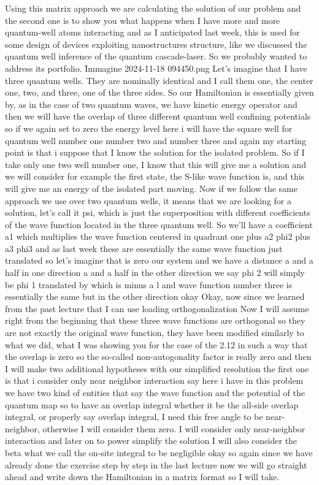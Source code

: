 Using this matrix approach we are calculating the solution of our problem and the second one is to show you what happens when I have more and more quantum-well atoms interacting and as I anticipated last week, this is used for some design of devices exploiting nanostructures structure, like we discussed the quantum well inference of the quantum cascade-laser. So we probably wanted to address its portfolio.
\f{Immagine 2024-11-18 094450.png}
Let's imagine that I have three quantum wells. They are nominally identical and I call them one, the center one, two, and three, one of the three sides. So our Hamiltonian is essentially given by, as in the case of two quantum waves, we have kinetic energy operator and then we will have the overlap of three different quantum well confining potentials so if we again set to zero the energy level here i will have the square well for quantum well number one number two and number three and again my starting point is that i suppose that I know the solution for the isolated problem. So if I take only one two well number one, I know that this will give me a solution and we will consider for example the first state, the S-like wave function is, and this will give me an energy of the isolated part moving. Now if we follow the same approach we use over two quantum wells, it means that we are looking for a solution, let's call it psi, which is just the superposition with different coefficients of the wave function located in the three quantum well. So we'll have a coefficient a1 which multiplies the wave function centered in quadrant one plus a2 phi2 plus a3 phi3 and as last week these are essentially the same wave function just translated so let's imagine that is zero our system and we have a distance a and a half in one direction a and a half in the other direction we say phi 2 will simply be phi 1 translated by which is minus a l and wave function number three is essentially the same but in the other direction okay Okay, now since we learned from the past lecture that I can use loading orthogonalization Now I will assume right from the beginning that these three wave functions are orthogonal so they are not exactly the original wave function, they have been modified similarly to what we did, what I was showing you for the case of the 2.12 in such a way that the overlap is zero so the so-called non-autogonality factor is really zero and then I will make two additional hypotheses with our simplified resolution the first one is that i consider only near neighbor interaction say here i have in this problem we have two kind of entities that say the wave function and the potential of the quantum map so to have an overlap integral whether it be the all-side overlap integral, or properly say overlap integral, I need this free angle to be near-neighbor, otherwise I will consider them zero. I will consider only near-neighbor interaction and later on to power simplify the solution I will also consider the beta what we call the on-site integral to be negligible okay so again since we have already done the exercise step by step in the last lecture now we will go straight ahead and write down the Hamiltonian in a matrix format so I will take.
